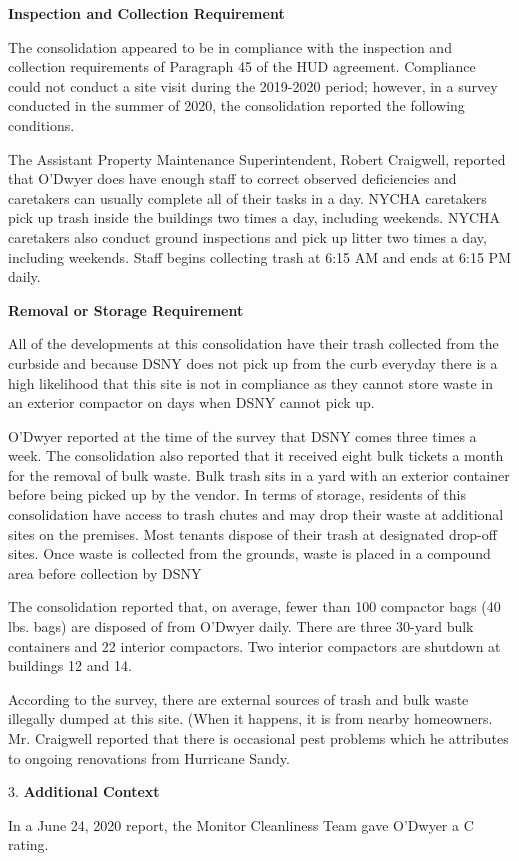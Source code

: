 

\textbf{Inspection and Collection Requirement}

The consolidation appeared to be in compliance with the inspection and collection requirements of Paragraph 45 of the HUD agreement. Compliance could not conduct a site visit during the 2019-2020 period; however, in a survey conducted in the summer of 2020, the consolidation reported the following conditions.

The Assistant Property Maintenance Superintendent, Robert Craigwell, reported that O'Dwyer does have enough staff to correct observed deficiencies and caretakers can usually complete all of their tasks in a day. NYCHA caretakers pick up trash inside the buildings two times a day, including weekends. NYCHA caretakers also conduct ground inspections and pick up litter two times a day, including weekends. Staff begins collecting trash at 6:15 AM and ends at 6:15 PM daily. 

\textbf{Removal or Storage Requirement}

All of the developments at this consolidation have their trash collected from the curbside and because DSNY does not pick up from the curb everyday there is a high likelihood that this site is not in compliance as they cannot store waste in an exterior compactor on days when DSNY cannot pick up.

O'Dwyer reported at the time of the survey that DSNY comes three times a week. The consolidation also reported that it received eight bulk tickets a month for the removal of bulk waste. Bulk trash sits in a yard with an exterior container before being picked up by the vendor. In terms of storage, residents of this consolidation have access to trash chutes and may drop their waste at  additional sites on the premises. Most tenants dispose of their trash at designated drop-off sites. Once waste is collected from the grounds, waste is placed in a compound area before collection by DSNY

The consolidation reported that, on average, fewer than 100 compactor bags (40 lbs. bags) are disposed of from O'Dwyer daily. There are three 30-yard bulk containers and 22 interior compactors. Two interior compactors are shutdown at buildings 12 and 14.

According to the survey, there are external sources of trash and bulk waste illegally dumped at this site. (When it happens, it is from nearby homeowners. Mr. Craigwell reported that there is occasional pest problems which he attributes to ongoing renovations from Hurricane Sandy.

3. \textbf{Additional Context} 

In a June 24, 2020 report, the Monitor Cleanliness Team gave O'Dwyer a C rating. 